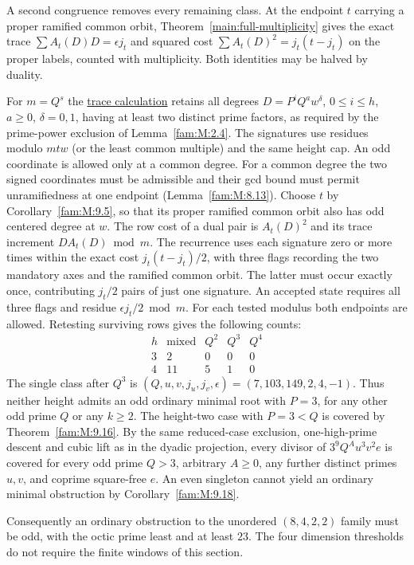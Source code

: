 \documentclass[11pt,a4paper]{article}
\numberwithin{equation}{section}
\theoremstyle{remark}
\begin{document}
A second congruence removes every remaining class. At the endpoint
$t$ carrying a proper ramified common orbit,
Theorem~\ref{main:full-multiplicity} gives the exact trace
$\sum A_t(D)D=\epsilon j_t$ and squared cost
$\sum A_t(D)^2=j_t(t-j_t)$ on the proper labels, counted with
multiplicity. Both identities may be halved by duality.

For $m=Q^s$ the \href{https://github.com/sebastienpalcoux/WGT-fusion-categories/blob/f7f9f9a02f3116e61eb9dca4eebfed77001494e8/code/four_primes/odd_trace.py}{trace calculation} retains all degrees
$D=P^i Q^a w^\delta$, $0\le i\le h$, $a\ge0$, $\delta=0,1$,
having at least two distinct prime factors, as required by the
prime-power exclusion of Lemma~\ref{fam:M:2.4}. The signatures use residues modulo
$mtw$ (or the least common multiple) and the same height cap.
An odd coordinate is allowed only at a common degree. For a common degree
the two signed coordinates must be admissible and their gcd bound must
permit unramifiedness at one endpoint (Lemma~\ref{fam:M:8.13}).
Choose $t$ by Corollary~\ref{fam:M:9.5}, so that its proper ramified common orbit
also has odd centered degree at $w$. The row cost of a dual pair is
$A_t(D)^2$ and its trace increment $D A_t(D)\bmod m$. The recurrence
uses each signature zero or more times within the exact cost
$j_t(t-j_t)/2$, with three flags recording the two mandatory axes
and the ramified common orbit. The latter must occur exactly once,
contributing $j_t/2$ pairs of just one signature. An accepted state
requires all three flags and residue $\epsilon j_t/2\bmod m$.
For each tested modulus both endpoints are allowed. Retesting surviving
rows gives the following counts:
\[
\begin{array}{c|rrrr}
  h&\text{mixed}&Q^2&Q^3&Q^4\\\hline
  3&2&0&0&0\\
  4&11&5&1&0
\end{array}
\]
The single class after $Q^3$ is
$(Q,u,v,j_u,j_v,\epsilon)=(7,103,149,2,4,-1)$.
Thus neither height admits an odd ordinary minimal root with $P=3$,
for any other odd prime $Q$ or any $k\ge2$. The height-two
case with $P=3<Q$ is covered by Theorem~\ref{fam:M:9.16}. By the same
reduced-case exclusion, one-high-prime descent and cubic lift as in the
dyadic projection, every divisor of $3^9 Q^A u^3 v^2 e$ is covered
for every odd prime $Q>3$, arbitrary $A\ge0$, any further distinct
primes $u,v$, and coprime square-free $e$. An even singleton cannot
yield an ordinary minimal obstruction by Corollary~\ref{fam:M:9.18}.
\par Consequently an ordinary obstruction to the unordered $(8,4,2,2)$ family must be odd, with the octic prime least and at least $23$. The four dimension thresholds do not require the finite windows of this section.
\end{document}
